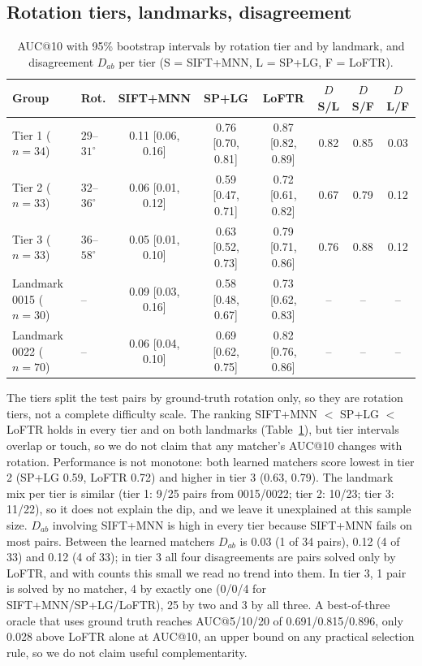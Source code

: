 \documentclass[10pt,twocolumn,letterpaper]{article}
\newcommand{\dg}{^{\circ}}
\begin{document}
\subsection{Rotation tiers, landmarks, disagreement}
\begin{table}[t]\centering\small
\begin{tabular}{llccc ccc}
\toprule
Group & Rot. & SIFT+MNN & SP+LG & LoFTR & $D$ S/L & $D$ S/F & $D$ L/F\\
\midrule
Tier 1 ($n{=}34$) & $29$--$31\dg$ & 0.11 [0.06, 0.16] & 0.76 [0.70, 0.81] & 0.87 [0.82, 0.89] & 0.82 & 0.85 & 0.03\\
Tier 2 ($n{=}33$) & $32$--$36\dg$ & 0.06 [0.01, 0.12] & 0.59 [0.47, 0.71] & 0.72 [0.61, 0.82] & 0.67 & 0.79 & 0.12\\
Tier 3 ($n{=}33$) & $36$--$58\dg$ & 0.05 [0.01, 0.10] & 0.63 [0.52, 0.73] & 0.79 [0.71, 0.86] & 0.76 & 0.88 & 0.12\\
Landmark 0015 ($n{=}30$) & -- & 0.09 [0.03, 0.16] & 0.58 [0.48, 0.67] & 0.73 [0.62, 0.83] & -- & -- & --\\
Landmark 0022 ($n{=}70$) & -- & 0.06 [0.04, 0.10] & 0.69 [0.62, 0.75] & 0.82 [0.76, 0.86] & -- & -- & --\\
\bottomrule
\end{tabular}
\caption{AUC@10 with 95\% bootstrap intervals by rotation tier and by landmark, and disagreement $D_{ab}$ per tier (S = SIFT+MNN, L = SP+LG, F = LoFTR).}\label{tab:tier}
\end{table}
The tiers split the test pairs by ground-truth rotation only, so they are rotation tiers, not a complete difficulty scale. The ranking SIFT+MNN $<$ SP+LG $<$ LoFTR holds in every tier and on both landmarks (Table~\ref{tab:tier}), but tier intervals overlap or touch, so we do not claim that any matcher's AUC@10 changes with rotation. Performance is not monotone: both learned matchers score lowest in tier 2 (SP+LG 0.59, LoFTR 0.72) and higher in tier 3 (0.63, 0.79). The landmark mix per tier is similar (tier 1: 9/25 pairs from 0015/0022; tier 2: 10/23; tier 3: 11/22), so it does not explain the dip, and we leave it unexplained at this sample size.
$D_{ab}$ involving SIFT+MNN is high in every tier because SIFT+MNN fails on most pairs. Between the learned matchers $D_{ab}$ is 0.03 (1 of 34 pairs), 0.12 (4 of 33) and 0.12 (4 of 33); in tier 3 all four disagreements are pairs solved only by LoFTR, and with counts this small we read no trend into them. In tier 3, 1 pair is solved by no matcher, 4 by exactly one (0/0/4 for SIFT+MNN/SP+LG/LoFTR), 25 by two and 3 by all three. A best-of-three oracle that uses ground truth reaches AUC@5/10/20 of 0.691/0.815/0.896, only 0.028 above LoFTR alone at AUC@10, an upper bound on any practical selection rule, so we do not claim useful complementarity.
\end{document}
